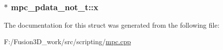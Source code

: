 \subsubsection[{x}]{$\ast$ mpc\+\_\+pdata\+\_\+not\+\_\+t\+::x}\label{structmpc__pdata__not__t_ad85e877b39bdaa6993d93ad5f8fbe2e9}


The documentation for this struct was generated from the following file\+:\begin{DoxyCompactItemize}
\item 
F\+:/\+Fusion3\+D\+\_\+work/src/scripting/\hyperlink{mpc_8cpp}{mpc.\+cpp}\end{DoxyCompactItemize}
